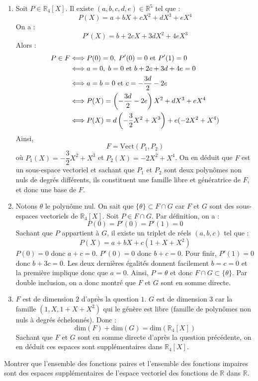 \documentclass[a4paper,10pt]{report}
\begin{document}
\begin{enumerate}
\item Soit $P \in \mathbb{R}_4[X]$. Il existe $(a,b,c,d,e) \in \mathbb{R}^5$ tel que :
$$ P(X) = a+bX+cX^2+dX^3+eX^4$$
On a :
$$ P'(X) = b+2cX+3dX^2+4eX^3$$
Alors :
\begin{align*}
P \in F & \Longleftrightarrow P(0)=0, \; P'(0)=0 \hbox{ et } P'(1)=0 \\
& \Longleftrightarrow a=0, \; b=0 \hbox{ et } b+2c+3d+4e = 0 \\
& \Longleftrightarrow a=b=0 \hbox{ et } c= -\dfrac{3d}{2} - 2e \\
& \Longleftrightarrow P(X) = \left( -\dfrac{3d}{2} - 2e \right)X^2 + d X^3 + eX^4 \\
& \Longleftrightarrow P(X) = d \left( - \dfrac{3}{2}X^2+ X^3 \right) + e (-2X^2+X^4)
\end{align*}
Ainsi,
$$ F= \textrm{Vect}(P_1,P_2)$$
où $P_1(X) = - \dfrac{3}{2}X^2+ X^3$ et $P_2(X)= -2X^2+X^4$. On en déduit que $F$ est un sous-espace vectoriel et sachant que $P_1$ et $P_2$ sont deux polynômes non nuls de degrés différents, ils constituent une famille libre et génératrice de $F$, et donc une base de $F$.
\item Notons $\theta$ le polynôme nul. On sait que $\lbrace \theta \rbrace \subset F \cap G$ car $F$ et $G$ sont des sous-espaces vectoriels de $\mathbb{R}_4[X]$. Soit $P \in F \cap G$. Par définition, on a :
$$ P(0)=P'(0)=P'(1)=0$$
Sachant que $P$ appartient à $G$, il existe un triplet de réels $(a,b,c)$ tel que :
$$ P(X)= a + bX + c(1+X+X^2)$$
$P(0)=0$ donc $a+c=0$. $P'(0)=0$ donc $b+c=0$. Pour finir, $P'(1)=0$ donc $b+3c=0$. Les deux dernières égalités donnent facilement $b=c=0$ et la première implique donc que $a=0$. Ainsi, $P= \theta$ et donc $ F \cap G \subset \lbrace \theta \rbrace$. Par double inclusion, on a donc montré que $F$ et $G$ sont en somme directe.
\item $F$ est de dimension $2$ d'après la question $1$. $G$ est de dimension $3$ car la famille $(1,X,1+X+X^2)$ qui le génère est libre (famille de polynômes non nuls à degrés échelonnés). Donc :
$$ \textrm{dim}(F)+ \textrm{dim}(G) = \textrm{dim}(\mathbb{R}_4[X])$$
Sachant que $F$ et $G$ sont en somme directe d'après la question précédente, on en déduit ces espaces sont supplémentaires dans $\mathbb{R}_4[X]$.
\end{enumerate}

\medskip

\begin{Exa} Montrer que l'ensemble des fonctions paires et l'ensemble des fonctions impaires sont des espaces supplémentaires de l'espace vectoriel des fonctions de $\mathbb{R}$ dans $\mathbb{R}$. 
\end{Exa}
\end{document}
